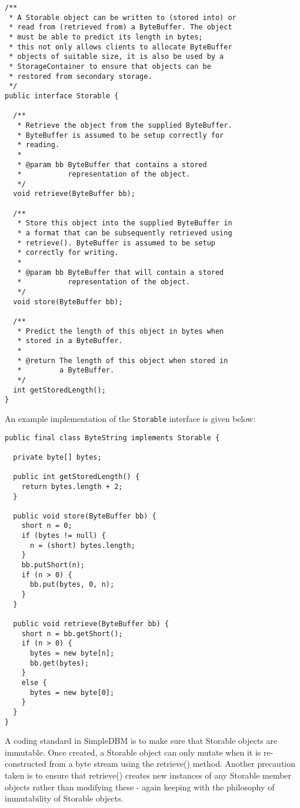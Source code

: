 \documentclass[a4paper,draft,oneside]{book}
\begin{document}
\begin{verbatim}
/**
 * A Storable object can be written to (stored into) or 
 * read from (retrieved from) a ByteBuffer. The object 
 * must be able to predict its length in bytes;
 * this not only allows clients to allocate ByteBuffer 
 * objects of suitable size, it is also be used by a 
 * StorageContainer to ensure that objects can be
 * restored from secondary storage.
 */
public interface Storable {

  /**
   * Retrieve the object from the supplied ByteBuffer. 
   * ByteBuffer is assumed to be setup correctly for 
   * reading.
   * 
   * @param bb ByteBuffer that contains a stored 
   *           representation of the object.
   */
  void retrieve(ByteBuffer bb);

  /**
   * Store this object into the supplied ByteBuffer in 
   * a format that can be subsequently retrieved using 
   * retrieve(). ByteBuffer is assumed to be setup 
   * correctly for writing.
   * 
   * @param bb ByteBuffer that will contain a stored 
   *           representation of the object.
   */
  void store(ByteBuffer bb);

  /**
   * Predict the length of this object in bytes when 
   * stored in a ByteBuffer.
   * 
   * @return The length of this object when stored in 
   *         a ByteBuffer.
   */
  int getStoredLength();
}
\end{verbatim}

An example implementation of the \verb|Storable| interface is 
given below:

\begin{verbatim}
public final class ByteString implements Storable {
    
  private byte[] bytes;
    
  public int getStoredLength() {
    return bytes.length + 2;
  }
    
  public void store(ByteBuffer bb) {
    short n = 0;
    if (bytes != null) {
      n = (short) bytes.length;
    }
    bb.putShort(n);
    if (n > 0) {
      bb.put(bytes, 0, n);
    }
  }
    
  public void retrieve(ByteBuffer bb) {
    short n = bb.getShort();
    if (n > 0) {
      bytes = new byte[n];
      bb.get(bytes);
    }
    else {
      bytes = new byte[0];
    }
  }
}
\end{verbatim}

A coding standard in SimpleDBM is to make sure that Storable objects
are immutable. Once created, a Storable object can only mutate when it
is re-constructed from a byte stream using the retrieve()
method. Another precaution taken is to ensure that retrieve() creates
new instances of any Storable member objects rather than modifying
these - again keeping with the philosophy of immutability of Storable
objects.
\end{document}
